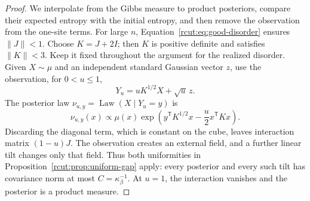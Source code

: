\begin{proof}
We interpolate from the Gibbs measure to product posteriors, compare
their expected entropy with the initial entropy, and then remove the
observation from the one-site terms.  For large $n$,
Equation~\eqref{rcut:eq:good-disorder} ensures $\|J\|<1$.
Choose $K=J+2I$; then $K$ is positive definite and satisfies $\|K\|<3$.
Keep it fixed throughout the argument for the realized disorder.
Given $X\sim\mu$ and an independent standard Gaussian vector $z$, use
the observation, for $0<u\le1$,
\[
 Y_u=uK^{1/2}X+\sqrt u\,z.
\]
The posterior law $\nu_{u,y}=\operatorname{Law}(X\mid Y_u=y)$ is
\begin{equation}
 \nu_{u,y}(x)\propto\mu(x)
    \exp\left(y^{\mathsf T}K^{1/2}x-\frac u2x^{\mathsf T}Kx\right).
 \label{rcut:eq:gaussian-posterior}
\end{equation}
Discarding the diagonal term, which is constant on the cube, leaves
interaction matrix $(1-u)J$.  The observation creates an external field,
and a further linear tilt changes only that field.  Thus both uniformities
in Proposition~\ref{rcut:prop:uniform-gap} apply: every posterior and
every such tilt has covariance norm at most $C=\kappa_\beta^{-1}$.
At $u=1$, the interaction vanishes and the posterior is a product measure.


\end{proof}
